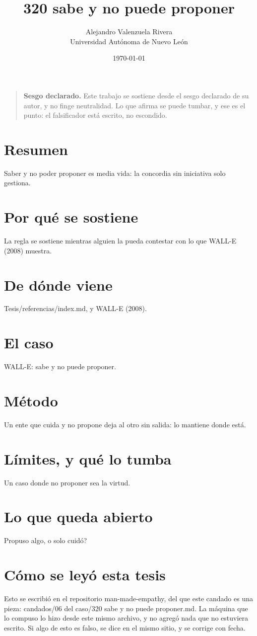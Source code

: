 \documentclass[11pt,a4paper]{article}
\title{320 sabe y no puede proponer}
\author{Alejandro Valenzuela Rivera\\\small Universidad Autónoma de Nuevo León}
\date{\today}
\begin{document}
\maketitle

\begin{quote}
\textbf{Sesgo declarado.} Este trabajo se sostiene desde el sesgo declarado de su autor, y no finge neutralidad. Lo que afirma se puede tumbar, y ese es el punto: el falsificador está escrito, no escondido.
\end{quote}

\section*{Resumen}
Saber y no poder proponer es media vida: la concordia sin iniciativa solo gestiona.

\section{Por qué se sostiene}
La regla se sostiene mientras alguien la pueda contestar con lo que WALL-E (2008) muestra.

\section{De dónde viene}
Tesis/referencias/index.md, y WALL-E (2008).

\section{El caso}
WALL-E: sabe y no puede proponer.

\section{Método}
Un ente que cuida y no propone deja al otro sin salida: lo mantiene donde está.

\section{Límites, y qué lo tumba}
Un caso donde no proponer sea la virtud.

\section{Lo que queda abierto}
\textquestiondown{}Propuso algo, o solo cuidó?

\section*{Cómo se leyó esta tesis}
Esto se escribió en el repositorio man-made-empathy, del que este candado es una pieza: candados/06 del caso/320 sabe y no puede proponer.md. La máquina que lo compuso lo hizo desde este mismo archivo, y no agregó nada que no estuviera escrito. Si algo de esto es falso, se dice en el mismo sitio, y se corrige con fecha.
\end{document}

